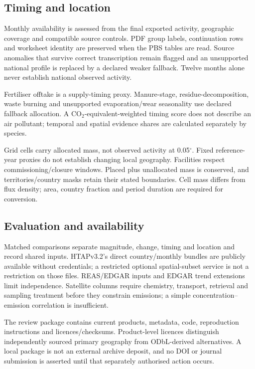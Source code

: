 \subsection{Timing and location}
\label{lim:monthly-physics}\label{lim:monthly-grade}\label{lim:monthly-gap}
Monthly availability is assessed from the final exported activity, geographic coverage and compatible source controls. PDF group labels, continuation rows and worksheet identity are preserved when the PBS tables are read. Source anomalies that survive correct transcription remain flagged and an unsupported national profile is replaced by a declared weaker fallback. Twelve months alone never establish national observed activity.

Fertiliser offtake is a supply-timing proxy. Manure-stage, residue-decomposition, waste burning and unsupported evaporation/wear seasonality use declared fallback allocation. A CO$_2$-equivalent-weighted timing score does not describe an air pollutant; temporal and spatial evidence shares are calculated separately by species.

Grid cells carry allocated mass, not observed activity at 0.05$^\circ$. Fixed reference-year proxies do not establish changing local geography. Facilities respect commissioning/closure windows. Placed plus unallocated mass is conserved, and territories/country masks retain their stated boundaries. Cell mass differs from flux density; area, country fraction and period duration are required for conversion.

\subsection{Evaluation and availability}
\label{lim:deposit}
Matched comparisons separate magnitude, change, timing and location and record shared inputs. HTAPv3.2's direct country/monthly bundles are publicly available without credentials; a restricted optional spatial-subset service is not a restriction on those files. REAS/EDGAR inputs and EDGAR trend extensions limit independence. Satellite columns require chemistry, transport, retrieval and sampling treatment before they constrain emissions; a simple concentration--emission correlation is insufficient.

The review package contains current products, metadata, code, reproduction instructions and licences/checksums. Product-level licences distinguish independently sourced primary geography from ODbL-derived alternatives. A local package is not an external archive deposit, and no DOI or journal submission is asserted until that separately authorised action occurs.
